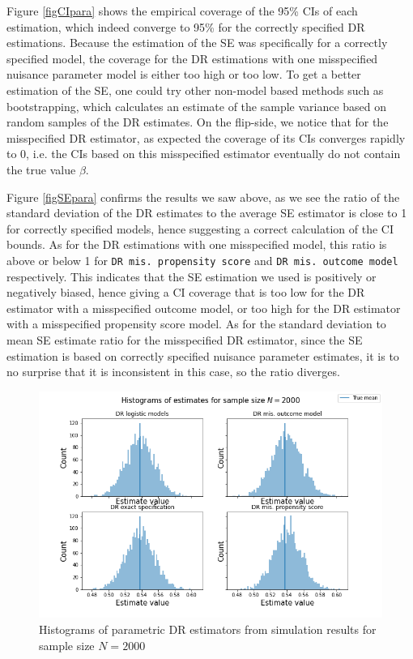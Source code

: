 \documentclass[12pt,twoside]{article}
\begin{document}
Figure \ref{figCIpara} shows the empirical coverage of the 95\% CIs of each estimation, which indeed converge to 95\% for the correctly specified DR estimations. Because the estimation of the SE was specifically for a correctly specified model, the coverage for the DR estimations with one misspecified nuisance parameter model is either too high or too low. To get a better estimation of the SE, one could try other non-model based methods such as bootstrapping, which calculates an estimate of the sample variance based on random samples of the DR estimates. On the flip-side, we notice that for the misspecified DR estimator, as expected the coverage of its CIs converges rapidly to 0, i.e. the CIs based on this misspecified estimator eventually do not contain the true value $\beta$.

Figure \ref{figSEpara} confirms the results we saw above, as we see the ratio of the standard deviation of the DR estimates to the average SE estimator is close to 1 for correctly specified models, hence suggesting a correct calculation of the CI bounds. As for the DR estimations with one misspecified model, this ratio is above or below 1 for \texttt{DR mis. propensity score} and \texttt{DR mis. outcome model} respectively. This indicates that the SE estimation we used is positively or negatively biased, hence giving a CI coverage that is too low for the DR estimator with a misspecified outcome model, or too high for the DR estimator with a misspecified propensity score model. As for the standard deviation to mean SE estimate ratio for the misspecified DR estimator, since the SE estimation is based on correctly specified nuisance parameter estimates, it is to no surprise that it is inconsistent in this case, so the ratio diverges.

\begin{figure}[h!]
    \centering
    \includegraphics[width = 0.9\columnwidth]{figures/histpara.png}
    \caption{Histograms of parametric DR estimators from simulation results for sample size $N = 2000$}
    \label{fighistpara}
\end{figure}
\end{document}
